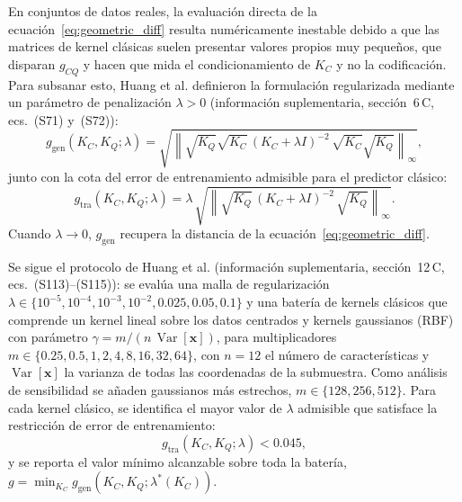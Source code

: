 En conjuntos de datos reales, la evaluación directa de la ecuación~\eqref{eq:geometric_diff}
resulta numéricamente inestable debido a que las matrices de kernel clásicas suelen presentar
valores propios muy pequeños, que disparan $g_{CQ}$ y hacen que mida el condicionamiento de $K_C$ y no la codificación. Para subsanar esto, Huang et al. \cite{huang2021power} definieron
la formulación regularizada mediante un parámetro de penalización $\lambda > 0$ (información suplementaria, sección~6\,C, ecs.~(S71) y~(S72)):
\begin{equation}
  g_{\text{gen}}(K_C, K_Q; \lambda) = \sqrt{\left\| \sqrt{K_Q}\sqrt{K_C}\,(K_C + \lambda I)^{-2}\,\sqrt{K_C}\sqrt{K_Q} \right\|_\infty},
  \label{eq:g_gen}
\end{equation}
junto con la cota del error de entrenamiento admisible para el predictor clásico:
\begin{equation}
  g_{\text{tra}}(K_C, K_Q; \lambda) = \lambda\,\sqrt{\left\| \sqrt{K_Q}\,(K_C + \lambda I)^{-2}\,\sqrt{K_Q} \right\|_\infty}.
  \label{eq:g_tra}
\end{equation}
Cuando $\lambda \to 0$, $g_{\text{gen}}$ recupera la distancia de la ecuación~\eqref{eq:geometric_diff}.

Se sigue el protocolo de Huang et al. (información suplementaria, sección~12\,C,
ecs.~(S113)--(S115)): se evalúa una malla de
regularización $\lambda \in \{10^{-5}, 10^{-4}, 10^{-3}, 10^{-2}, 0.025, 0.05, 0.1\}$ y una
batería de kernels clásicos que comprende un kernel lineal sobre los datos centrados
y kernels gaussianos (RBF) con parámetro $\gamma = m / (n\,\operatorname{Var}[\mathbf{x}])$,
para multiplicadores $m \in \{0.25,\allowbreak 0.5,\allowbreak 1,\allowbreak 2,\allowbreak 4,\allowbreak 8,\allowbreak 16,\allowbreak 32,\allowbreak 64\}$, con $n = 12$ el número de
características y $\operatorname{Var}[\mathbf{x}]$ la varianza de todas las coordenadas de la submuestra.
Como análisis de sensibilidad se añaden gaussianos más estrechos, $m \in \{128, 256, 512\}$.
Para cada kernel clásico, se identifica el mayor valor de $\lambda$ admisible que satisface la
restricción de error de entrenamiento:
\begin{equation}
  g_{\text{tra}}(K_C, K_Q; \lambda) < 0.045,
  \label{eq:gtra_admissibility}
\end{equation}
y se reporta el valor mínimo alcanzable sobre toda la batería,
$g = \min_{K_C} g_{\text{gen}}(K_C, K_Q; \lambda^*(K_C))$.

